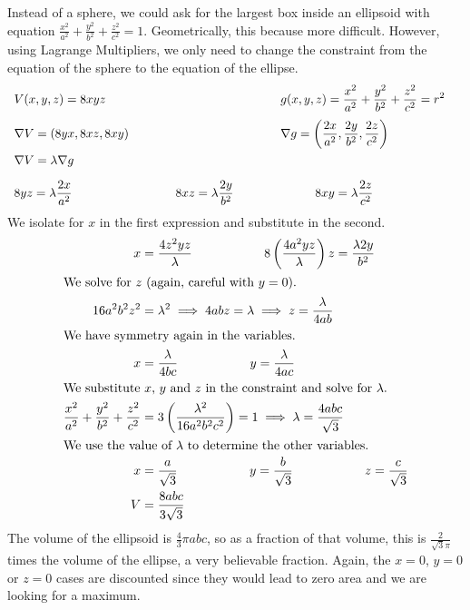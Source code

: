 \documentclass[fleqn,letterpaper]{report}
\begin{document}
\begin{example}
Instead of a sphere, we could ask for the largest box inside
an ellipsoid with equation $\frac{x^2}{a^2} + \frac{y^2}{b^2}
+ \frac{z^2}{c^2} = 1$. Geometrically, this because more
difficult. However, using Lagrange Multipliers, we only need
to change the constraint from the equation of the sphere to
the equation of the ellipse.
\begin{displaymath}
\begin{array}{*4{>{\displaystyle}l}}
V(x,y,z) = 8xyz & & 
\hspace{1cm} g(x,y,z) = \frac{x^2}{a^2} + \frac{y^2}{b^2} +
\frac{z^2}{c^2} = r^2 & \\[1em]
\nabla V = (8yx,8xz,8xy) & & 
\hspace{1cm} \nabla g = \left( \frac{2x}{a^2}, \frac{2y}{b^2},
\frac{2z}{c^2} \right) & \\[1em]
\nabla V = \lambda \nabla g & & & \\[1em]
8yz = \lambda \frac{2x}{a^2} &
\hspace{1cm} 8xz = \lambda \frac{2y}{b^2} &
\hspace{2cm} 8xy = \lambda \frac{2z}{c^2} \\
\end{array}
\end{displaymath}
We isolate for $x$ in the first expression and substitute in
the second.
\begin{align*}
x & = \frac{4z^2 yz}{\lambda} \hspace{2cm}
8 \left( \frac{4a^2yz}{\lambda} \right) z = \frac{\lambda
2y}{b^2} \\
\intertext{We solve for $z$ (again, careful with $y=0$).}
16a^2 b^2 z^2 & = \lambda^2 \implies
4abz = \lambda \implies 
z = \frac{\lambda}{4ab} \\
\intertext{We have symmetry again in the variables.}
x & = \frac{\lambda}{4bc} \hspace{2cm}
y = \frac{\lambda}{4ac} \\
\intertext{We substitute $x$, $y$ and $z$ in the constraint
and solve for $\lambda$.}
\frac{x^2}{a^2} + \frac{y^2}{b^2} +
\frac{z^2}{c^2} & = 3 \left( \frac{\lambda^2}{16a^2b^2c^2}
\right) = 1 \implies
\lambda = \frac{4abc}{\sqrt{3}} \\
\intertext{We use the value of $\lambda$ to determine the
other variables.}
x & = \frac{a}{\sqrt{3}} \hspace{2cm}
y = \frac{b}{\sqrt{3}} \hspace{2cm}
z = \frac{c}{\sqrt{3}} \\
V & = \frac{8abc}{3\sqrt{3}}
\end{align*}
The volume of the ellipsoid is $\frac{4}{3} \pi abc$, so as a
fraction of that volume, this is $\frac{2}{\sqrt{3}\pi}$ times
the volume of the ellipse, a very believable fraction. Again,
the $x=0$, $y=0$ or $z=0$ cases are discounted since they
would lead to zero area and we are looking for a maximum. 
\end{example}
\end{document}
